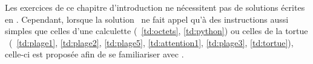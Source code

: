 
Les exercices de ce chapitre d'introduction ne nécessitent pas
de solutions écrites en \python.
Cependant, lorsque la solution \python\ ne fait appel
qu'à des instructions aussi simples que celles d'une calculette 
(\tdir\ \ref{td:octets}, \ref{td:python})
ou celles de la tortue \logo\ (\tdir\ \ref{td:plage1}, \ref{td:plage2}, \ref{td:plage5},
\ref{td:attention1}, \ref{td:plage3}, \ref{td:tortue}), celle-ci est proposée afin de se
familiariser avec \python.
\vspace*{2mm}


\begin{td}\label{td:plage1}
	\em\mbox{}\\[-1.2cm]
	\vspace*{2mm}
	
\end{td}

\begin{td}\label{td:plage2}
	\em\mbox{}\\[-1.2cm]
	\vspace*{2mm}
	
\end{td}


\begin{td}\label{td:propPlage}
	\em\mbox{}\\[-1.2cm]
	\vspace*{2mm}
	
\end{td}


\begin{td}\label{td:octets}
	\em\mbox{}\\[-1.2cm]
	\vspace*{2mm}
	
\end{td}

